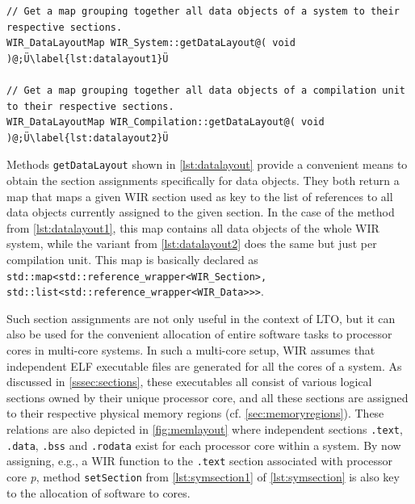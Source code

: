 \begin{lstlisting}[style=code,float=t,caption={Data Layout Handling of Classes \texttt{WIR\_System} and \texttt{WIR\_CompilationUnit}},label=lst:datalayout]
// Get a map grouping together all data objects of a system to their respective sections.
WIR_DataLayoutMap WIR_System::getDataLayout@( void )@;Ü\label{lst:datalayout1}Ü

// Get a map grouping together all data objects of a compilation unit to their respective sections.
WIR_DataLayoutMap WIR_Compilation::getDataLayout@( void )@;Ü\label{lst:datalayout2}Ü
\end{lstlisting}

Methods \texttt{getDataLayout} shown in \cref{lst:datalayout} provide a convenient means to obtain the section assignments specifically for data objects.
They both return a map that maps a given \gls{WIR} section used as key to the list of references to all data objects currently assigned to the given section.
In the case of the method from \cref{lst:datalayout1}, this map contains all data objects of the whole \gls{WIR} system, while the variant from \cref{lst:datalayout2} does the same but just per compilation unit.
This map is basically declared as \texttt{std::map<std::reference\_wrapper<WIR\_Section>, std::list<std::reference\_wrapper<WIR\_Data>{}>{}>}.

Such section assignments are not only useful in the context of \gls{LTO}, but it can also be used for the convenient allocation of entire software tasks to processor cores in multi-core systems.
In such a multi-core setup, \gls{WIR} assumes that independent \gls{ELF} executable files are generated for all the cores of a system.
As discussed in \cref{sssec:sections}, these executables all consist of various logical sections owned by their unique processor core, and all these sections are assigned to their respective physical memory regions (cf. \cref{sec:memoryregions}).
These relations are also depicted in \cref{fig:memlayout} where independent sections \texttt{.text}, \texttt{.data}, \texttt{.bss} and \texttt{.rodata} exist for each processor core within a system.
By now assigning, e.g., a \gls{WIR} function to the \texttt{.text} section associated with processor core \emph{p}, method \texttt{setSection} from \cref{lst:symsection1} of \cref{lst:symsection} is also key to the allocation of software to cores.


